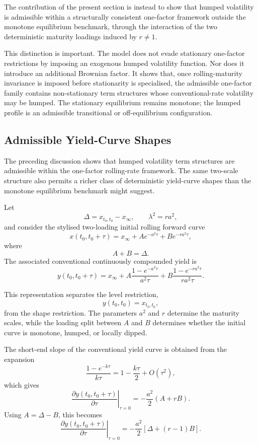 \documentclass[12pt]{article}
\theoremstyle{statementstyle}
\begin{document}
The contribution of the present section is instead to show that humped volatility is admissible within a structurally consistent one-factor framework outside the monotone equilibrium benchmark, through the interaction of the two deterministic maturity loadings induced by \(r\neq 1\).

This distinction is important. The model does not evade stationary one-factor restrictions by imposing an exogenous humped volatility function. Nor does it introduce an additional Brownian factor. It shows that, once rolling-maturity invariance is imposed before stationarity is specialised, the admissible one-factor family contains non-stationary term structures whose conventional-rate volatility may be humped. The stationary equilibrium remains monotone; the humped profile is an admissible transitional or off-equilibrium configuration.
\subsection{Admissible Yield-Curve Shapes}

The preceding discussion shows that humped volatility term structures are admissible within the one-factor rolling-rate framework. The same two-scale structure also permits a richer class of deterministic yield-curve shapes than the monotone equilibrium benchmark might suggest.

Let
\[
\Delta = x_{t_0,t_0}-x_\infty,
\qquad
\lambda^2 = r a^2,
\]
and consider the stylised two-loading initial rolling forward curve
\[
x(t_0,t_0+\tau)
=
x_\infty
+
A e^{-a^2\tau}
+
B e^{-r a^2\tau},
\]
where
\[
A+B=\Delta.
\]
The associated conventional continuously compounded yield is
\[
y(t_0,t_0+\tau)
=
x_\infty
+
A\frac{1-e^{-a^2\tau}}{a^2\tau}
+
B\frac{1-e^{-r a^2\tau}}{r a^2\tau}.
\]

This representation separates the level restriction,
\[
y(t_0,t_0)=x_{t_0,t_0},
\]
from the shape restriction. The parameters \(a^2\) and \(r\) determine the maturity scales, while the loading split between \(A\) and \(B\) determines whether the initial curve is monotone, humped, or locally dipped.

The short-end slope of the conventional yield curve is obtained from the expansion
\[
\frac{1-e^{-k\tau}}{k\tau}
=
1-\frac{k\tau}{2}+O(\tau^2),
\]
which gives
\[
\left.
\frac{\partial y(t_0,t_0+\tau)}{\partial \tau}
\right|_{\tau=0}
=
-\frac{a^2}{2}(A+rB).
\]
Using \(A=\Delta-B\), this becomes
\[
\left.
\frac{\partial y(t_0,t_0+\tau)}{\partial \tau}
\right|_{\tau=0}
=
-\frac{a^2}{2}
\left[
\Delta+(r-1)B
\right].
\]
\end{document}
